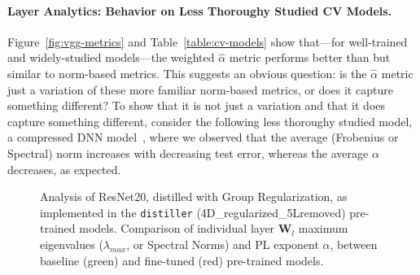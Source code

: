 \paragraph{Layer Analytics: Behavior on Less Thoroughy Studied CV Models.}

Figure~\ref{fig:vgg-metrics} and Table~\ref{table:cv-models} show that---for well-trained and widely-studied models---the weighted $\hat{\alpha}$ metric performs better than but similar to norm-based metrics.
This suggests an obvious question: is the $\hat{\alpha}$ metric just a variation of these more familiar norm-based metrics, or does it capture something different?  
To show that it is not just a variation and that it does capture something different, consider the following less thoroughy studied model, a compressed DNN model~\cite{CWZZ17_TR}, where we observed that the average (Frobenius or Spectral) norm increases with decreasing test error, whereas the average $\alpha$ decreases, as expected.  

\begin{figure}[t]
   \centering
   \qquad
   \caption{
     Analysis of ResNet20, distilled with Group Regularization, as implemented in the \texttt{distiller} (4D\_regularized\_5Lremoved) pre-trained models.  
     Comparison of individual layer $\mathbf{W}_{l}$ maximum eigenvalues ($\lambda_{max}$, or Spectral Norms) and  
     PL exponent $\alpha$, between baseline (green) and fine-tuned (red)  pre-trained models.   
           }
   \label{fig:resnet204D5L}
\end{figure}

